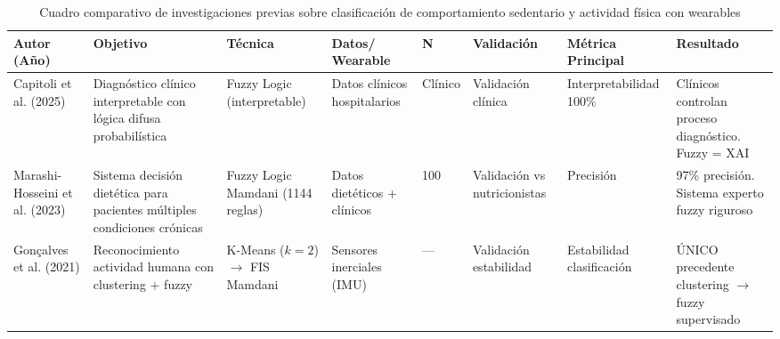 
\begin{table}[htbp]
    \centering
    \caption{Cuadro comparativo de investigaciones previas sobre clasificación de comportamiento sedentario y actividad física con wearables}
    \label{tab:comparativa_investigaciones}
    \footnotesize
    \begin{tabular}{@{}p{1.8cm}p{2.2cm}p{1.5cm}p{1.3cm}p{0.8cm}p{1.2cm}p{1.8cm}p{1.5cm}@{}}
        \toprule
        \textbf{Autor (Año)} & 
        \textbf{Objetivo} & 
        \textbf{Técnica} & 
        \textbf{Datos/ Wearable} & 
        \textbf{N} & 
        \textbf{Validación} & 
        \textbf{Métrica Principal} & 
        \textbf{Resultado} \\
        \midrule
        
        
        Capitoli et al. (2025) \cite{Capitoli2025FuzzyXAI} & 
        Diagnóstico clínico interpretable con lógica difusa probabilística & 
        Fuzzy Logic (interpretable) & 
        Datos clínicos hospitalarios & 
        Clínico & 
        Validación clínica & 
        Interpretabilidad 100\% & 
        Clínicos controlan proceso diagnóstico. Fuzzy = XAI \\
        
        \midrule
        
        Marashi-Hosseini et al. (2023) \cite{MarashiHosseini2023Dietary} & 
        Sistema decisión dietética para pacientes múltiples condiciones crónicas & 
        Fuzzy Logic Mamdani (1144 reglas) & 
        Datos dietéticos + clínicos & 
        100 & 
        Validación vs nutricionistas & 
        Precisión & 
        97\% precisión. Sistema experto fuzzy riguroso \\
        
        \midrule
        
        Gonçalves et al. (2021) \cite{Goncalves2021} & 
        Reconocimiento actividad humana con clustering + fuzzy & 
        K-Means ($k=2$) $\rightarrow$ FIS Mamdani & 
        Sensores inerciales (IMU) & 
        --- & 
        Validación estabilidad & 
        Estabilidad clasificación & 
        ÚNICO precedente clustering $\rightarrow$ fuzzy supervisado \\
        

\end{tabular}
\end{table}
